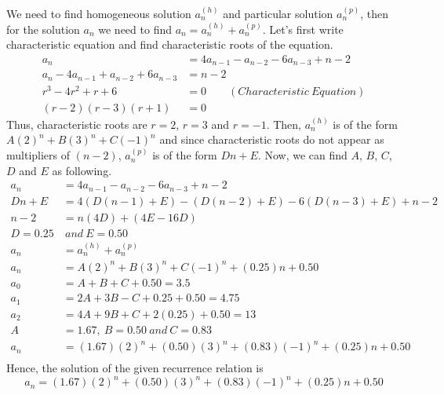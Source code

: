 \documentclass[12pt]{article}
\begin{document}
We need to find homogeneous solution $a_n^{(h)}$ and particular solution $a_n^{(p)}$, then for the solution $a_n$ we need to find $a_n = a_n^{(h)} + a_n^{(p)}$. Let's first write characteristic equation and find characteristic roots of the equation.
    \begin{equation} 
        \label{eq1}
        \begin{split}
            a_n & = 4a_{n-1} - a_{n-2} - 6a_{n-3} + n - 2 \\
            a_n - 4a_{n-1} + a_{n-2} + 6a_{n-3} & = n - 2 \\
            r^3 - 4r^2 + r + 6 & = 0 \qquad (Characteristic \ Equation) \\
            (r-2)(r-3)(r+1) & = 0
        \end{split}
        \end{equation}
    Thus, characteristic roots are $r = 2$, $r = 3$ and $r = -1$. Then, $a_n^{(h)}$ is of the form $A(2)^n + B(3)^n + C(-1)^n$ and since characteristic roots do not appear as multipliers of $(n-2)$, $a_n^{(p)}$ is of the form $Dn+E$. Now, we can find $A$, $B$, $C$, $D$ and $E$ as following.
    \begin{equation} 
        \label{eq1}
        \begin{split}
            a_n & = 4a_{n-1} - a_{n-2} - 6a_{n-3} + n - 2 \\
            Dn + E & = 4(D(n-1) + E) - (D(n-2)+E) - 6(D(n-3)+E) + n - 2 \\
            n - 2 & = n(4D)+(4E-16D) \\
            D = 0.25 & \ and \ E = 0.50\\
            a_n & = a_n^{(h)} + a_n^{(p)} \\
            a_n & = A(2)^n + B(3)^n + C(-1)^n + (0.25)n + 0.50 \\
            a_0 & = A + B + C + 0.50 = 3.5 \\
            a_1 & = 2A + 3B - C + 0.25 + 0.50 = 4.75 \\
            a_2 & = 4A + 9B + C + 2(0.25) + 0.50 = 13 \\
            A & = 1.67, \ B = 0.50 \ and \ C = 0.83 \\
            a_n & = (1.67)(2)^n + (0.50)(3)^n + (0.83)(-1)^n + (0.25)n + 0.50 \\
        \end{split}
        \end{equation}
    Hence, the solution of the given recurrence relation is
    \begin{equation*}
        a_n = (1.67)(2)^n + (0.50)(3)^n + (0.83)(-1)^n + (0.25)n + 0.50
    \end{equation*}
\end{document}
